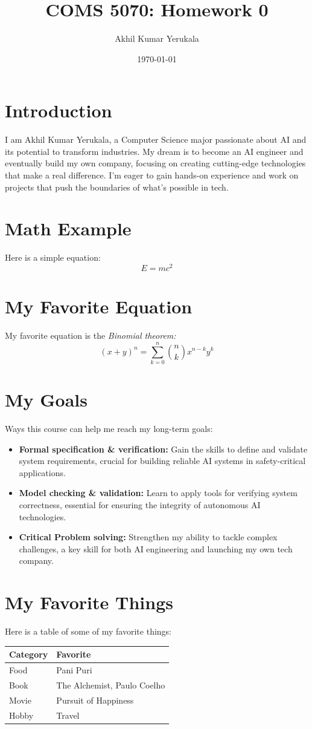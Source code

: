 \documentclass{article}
\title{COMS 5070: Homework 0}
\author{Akhil Kumar Yerukala}
\date{\today}
\begin{document}
\maketitle

\section{Introduction}
I am Akhil Kumar Yerukala, a Computer Science major passionate about AI and its potential to transform industries. My dream is to become an AI engineer and eventually build my own company, focusing on creating cutting-edge technologies that make a real difference. I'm eager to gain hands-on experience and work on projects that push the boundaries of what's possible in tech.

\section{Math Example}
Here is a simple equation:
\[
E = mc^2
\]

\section{My Favorite Equation}
My favorite equation is the \textit{Binomial theorem:} $$(x + y)^{n} = \sum_{k=0}^{n} \binom{n}{k} x^{n-k} y^{k}$$

\section{My Goals}
Ways this course can help me reach my long-term goals:
\begin{itemize}
    \item \textbf{Formal specification \& verification:} Gain the skills to define and validate system requirements, crucial for building reliable AI systems in safety-critical applications.
    \item \textbf{Model checking \& validation:} Learn to apply tools for verifying system correctness, essential for ensuring the integrity of autonomous AI technologies.
    \item \textbf{Critical Problem solving:} Strengthen my ability to tackle complex challenges, a key skill for both AI engineering and launching my own tech company.
\end{itemize}


\section{My Favorite Things}
Here is a table of some of my favorite things:
\begin{tabular}{|l|l|}
\hline
\textbf{Category} & \textbf{Favorite} \\
\hline
Food & Pani Puri \\
Book & The Alchemist, Paulo Coelho \\
Movie & Pursuit of Happiness \\
Hobby & Travel \\
\hline
\end{tabular}
\end{document}
